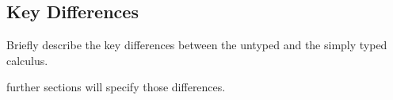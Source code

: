 \subsection{Key Differences}

Briefly describe the key differences between
the untyped and the simply typed calculus.

further sections will specify those differences.
